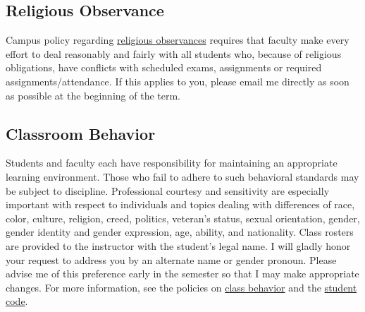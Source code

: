 \documentclass[11pt]{memoir}
\begin{document}
\subsection{Religious Observance}
Campus policy regarding \href{http://www.colorado.edu/policies/observance-religious-holidays-and-absences-classes-andor-exams}{religious observances} requires that faculty make every effort to deal reasonably and fairly with all students who, because of religious obligations, have conflicts with scheduled exams, assignments or required assignments/attendance. If this applies to you, please email me directly as soon as possible at the beginning of the term. 

\subsection{Classroom Behavior}
Students and faculty each have responsibility for maintaining an appropriate learning environment. Those who fail to adhere to such behavioral standards may be subject to discipline. Professional courtesy and sensitivity are especially important with respect to individuals and topics dealing with differences of race, color, culture, religion, creed, politics, veteran’s status, sexual orientation, gender, gender identity and gender expression, age, ability, and nationality.  Class rosters are provided to the instructor with the student's legal name. I will gladly honor your request to address you by an alternate name or gender pronoun. Please advise me of this preference early in the semester so that I may make appropriate changes. For more information, see the policies on \href{http://www.colorado.edu/policies/student-classroom-and-course-related-behavior}{class behavior} and the \href{http://www.colorado.edu/osc/#student_code}{student code}.
\end{document}
